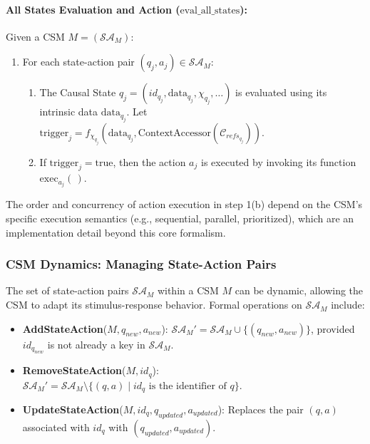     \paragraph{All States Evaluation and Action (\(\text{eval\_all\_states}\)):}
    Given a CSM \(M = (\mathcal{SA}_M)\):
    \begin{enumerate}
        \item For each state-action pair \((q_j, a_j) \in \mathcal{SA}_M\):
            \begin{enumerate}
                \item The Causal State \(q_j = (id_{q_j}, \text{data}_{q_j}, \chi_{q_j}, \dots)\) is evaluated using its intrinsic data \(\text{data}_{q_j}\).
                Let \( \text{trigger}_j = f_{\chi_{q_j}}(\text{data}_{q_j}, \text{ContextAccessor}(\mathcal{C}_{refs_{q_j}})) \).
                \item If \(\text{trigger}_j = \text{true}\), then the action \(a_j\) is executed by invoking its function \(\text{exec}_{a_j}(\,)\).
            \end{enumerate}
    \end{enumerate}
    The order and concurrency of action execution in step 1(b) depend on the CSM's specific execution semantics (e.g., sequential, parallel, prioritized), which are an implementation detail beyond this core formalism. 

    \subsubsection[CSM Dynamics: Managing State-Action Pairs]{CSM Dynamics: Managing State-Action Pairs}
    \label{ssec:csm_dynamics_formal_merged}

    The set of state-action pairs \(\mathcal{SA}_M\) within a CSM \(M\) can be dynamic, allowing the CSM to adapt its stimulus-response behavior. Formal operations on \(\mathcal{SA}_M\) include:
    \begin{itemize}
        \item \textbf{AddStateAction}(\(M, q_{new}, a_{new}\)): \( \mathcal{SA}_M' = \mathcal{SA}_M \cup \{(q_{new}, a_{new})\} \), provided \(id_{q_{new}}\) is not already a key in \(\mathcal{SA}_M\).
        \item \textbf{RemoveStateAction}(\(M, id_q\)): \( \mathcal{SA}_M' = \mathcal{SA}_M \setminus \{(q, a) \mid id_q \text{ is the identifier of } q \} \).
        \item \textbf{UpdateStateAction}(\(M, id_q, q_{updated}, a_{updated}\)): Replaces the pair \((q,a)\) associated with \(id_q\) with \((q_{updated}, a_{updated})\).
    \end{itemize}

